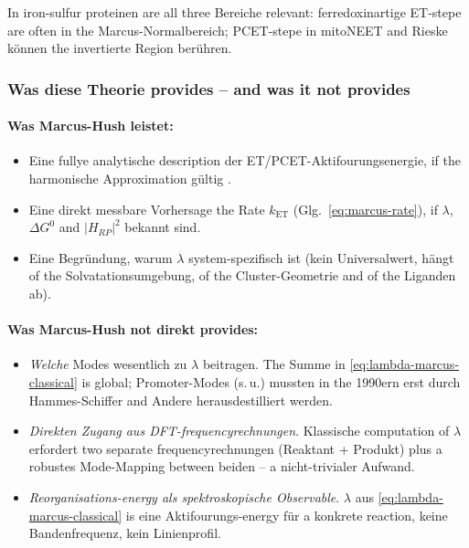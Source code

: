 \documentclass[11pt,a4paper,twoside]{article}
\theoremstyle{remark}
\begin{document}
In iron-sulfur proteinen are all three Bereiche relevant:
ferredoxinartige ET-stepe are often in the Marcus-Normalbereich;
PCET-stepe in mitoNEET and Rieske k\"onnen the invertierte Region
ber\"uhren.

\subsubsection*{Was diese Theorie provides -- and was it not provides}

\paragraph{Was Marcus-Hush leistet:}
\begin{itemize}\setlength{\itemsep}{0pt}
  \item Eine fullye analytische description der
        ET/PCET-Aktifourungsenergie, if the harmonische
        Approximation g\"ultig .
  \item Eine direkt messbare Vorhersage the Rate $k_\text{ET}$
        (Glg.~\ref{eq:marcus-rate}), if $\lambda$, $\Delta G^0$
        and $|H_{RP}|^2$ bekannt sind.
  \item Eine Begr\"undung, warum $\lambda$ system-spezifisch ist
        (kein Universalwert, h\"angt of the Solvatationsumgebung,
        of the Cluster-Geometrie and of the Liganden ab).
\end{itemize}

\paragraph{Was Marcus-Hush not direkt provides:}
\begin{itemize}\setlength{\itemsep}{0pt}
  \item \emph{Welche} Modes wesentlich zu $\lambda$ beitragen.
        The Summe in \eqref{eq:lambda-marcus-classical} is global;
        Promoter-Modes (s.\,u.) mussten in the 1990ern erst durch
        Hammes-Schiffer and Andere herausdestilliert werden.
  \item \emph{Direkten Zugang aus DFT-frequencyrechnungen}. Klassische
        computation of $\lambda$ erfordert two separate
        frequencyrechnungen (Reaktant + Produkt) plus a robustes
        Mode-Mapping between beiden -- a nicht-trivialer
        Aufwand.
  \item \emph{Reorganisations-energy als spektroskopische Observable}.
        $\lambda$ aus \eqref{eq:lambda-marcus-classical} is eine
        Aktifourungs-energy f\"ur a konkrete reaction, keine
        Bandenfrequenz, kein Linienprofil.
\end{itemize}
\end{document}
